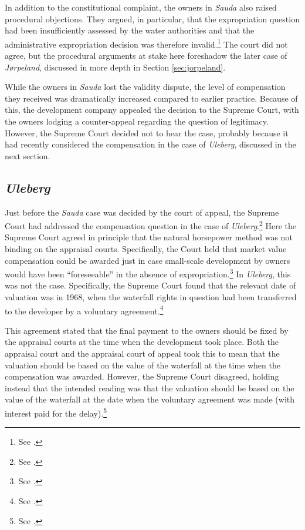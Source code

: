 In addition to the constitutional complaint, the owners in {\it Sauda} also raised procedural objections. They argued, in particular, that the expropriation question had been insufficiently assessed by the water authorities and that the administrative expropriation decision was therefore invalid.\footnote{See \cite{sauda09}.} The court did not agree, but the procedural arguments at stake here foreshadow the later case of {\it Jørpeland}, discussed in more depth in Section \ref{sec:jorpeland}.

While the owners in {\it Sauda} lost the validity dispute, the level of compensation they received was dramatically increased compared to earlier practice. Because of this, the development company appealed the decision to the Supreme Court, with the owners lodging a counter-appeal regarding the question of legitimacy. However, the Supreme Court decided not to hear the case, probably because it had recently considered the compensation in the case of {\it Uleberg}, discussed in the next section.

\subsection{{\it Uleberg}}

Just before the {\it Sauda} case was decided by the court of appeal, the Supreme Court had addressed the compensation question in the case of {\it Uleberg}.\footnote{See \cite{uleberg08}.} Here the Supreme Court agreed in principle that the natural horsepower method was not binding on the appraisal courts. Specifically, the Court held that market value compensation could be awarded just in case small-scale development by owners would have been ``foreseeable'' in the absence of expropriation.\footnote{See \cite[81]{uleberg08}.} In {\it Uleberg}, this was not the case. Specifically, the Supreme Court found that the relevant date of valuation was in 1968, when the waterfall rights in question had been transferred to the developer by a voluntary agreement.\footnote{See \cite[70]{uleberg08}.}

This agreement stated that the final payment to the owners should be fixed by the appraisal courts at the time when the development took place. Both the appraisal court and the appraisal court of appeal took this to mean that the valuation should be based on the value of the waterfall at the time when the compensation was awarded. However, the Supreme Court disagreed, holding instead that the intended reading was that the valuation should be based on the value of the waterfall at the date when the voluntary agreement was made (with interest paid for the delay).\footnote{See \cite[71]{uleberg08}.}

